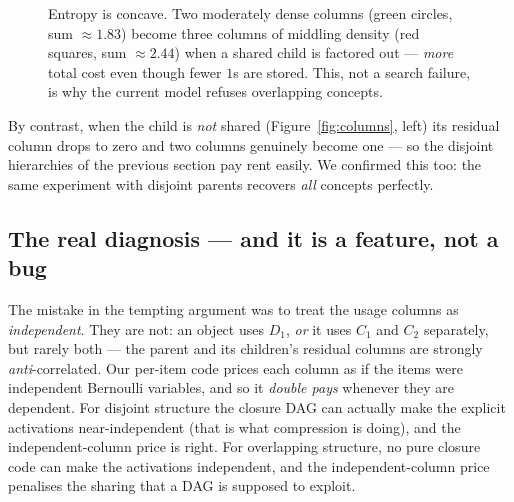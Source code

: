 \documentclass[11pt]{article}
\begin{document}
\begin{figure}[h]
\centering
{}
\caption{Entropy is concave. Two moderately dense columns (green circles, sum
$\approx 1.83$) become three columns of middling density (red squares, sum
$\approx 2.44$) when a shared child is factored out --- \emph{more} total cost
even though fewer $1$s are stored. This, not a search failure, is why the
current model refuses overlapping concepts.}
\label{fig:entropy}
\end{figure}

By contrast, when the child is \emph{not} shared (Figure~\ref{fig:columns},
left) its residual column drops to zero and two columns genuinely become one ---
so the disjoint hierarchies of the previous section pay rent easily. We
confirmed this too: the same experiment with disjoint parents recovers
\emph{all} concepts perfectly.

\subsection{The real diagnosis --- and it is a feature, not a bug}

The mistake in the tempting argument was to treat the usage columns as
\emph{independent}. They are not: an object uses $D_1$, \emph{or} it uses $C_1$
and $C_2$ separately, but rarely both --- the parent and its children's residual
columns are strongly \emph{anti}-correlated. Our per-item code prices each column
as if the items were independent Bernoulli variables, and so it \emph{double
pays} whenever they are dependent. For disjoint structure the closure DAG can
actually make the explicit activations near-independent (that is what
compression is doing), and the independent-column price is right. For overlapping
structure, no pure closure code can make the activations independent, and the
independent-column price penalises the sharing that a DAG is supposed to exploit.
\end{document}
